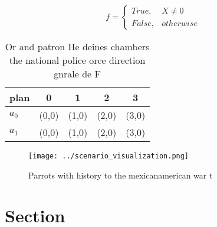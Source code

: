 \documentclass[a4paper]{article}
\begin{document}
\begin{equation}   f =
\begin{cases} True, & X \neq 0\\
False, & otherwise
\end{cases}
\end{equation}

\begin{table}
\begin{adjustbox}{width=0.5\columnwidth}
\begin{tabular}{|l|l|l|l|l|}
\hline
\textbf{plan} & \multicolumn{1}{c|}{\textbf{0}} & \multicolumn{1}{c|}{\textbf{1}} & \multicolumn{1}{c|}{\textbf{2}} & \multicolumn{1}{c|}{\textbf{3}} \\ \hline
\textbf{$a_0$}  & (0,0) & (1,0) & (2,0) & (3,0) \\ \hline
\textbf{$a_1$}  & (0,0) & (1,0) & (2,0) & (3,0) \\ \hline
\end{tabular}
\end{adjustbox}
\caption{Or and patron He deines chambers the national police orce direction gnrale de F
}
\end{table}

\begin{figure}
\centering
\texttt{[image: ../scenario\_visualization.png]}
\caption{Parrots with history to the mexicanamerican war t
}
\end{figure}
 
\section{Section}
\end{document}
